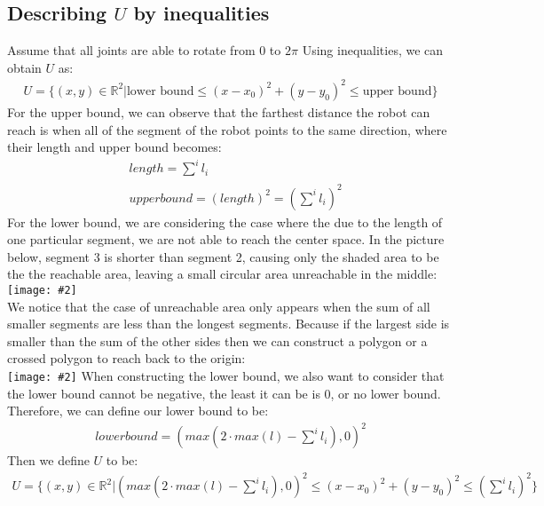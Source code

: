\documentclass[11pt]{article}
\newcommand{\image}[2]{\texttt{[image: \#2]}}
\newcommand{\myalign}[1]{\begin{align*}#1\end{align*}}
\begin{document}
\subsection{Describing $U$ by inequalities}
Assume that all joints are able to rotate from 0 to $2\pi$ Using inequalities, we can obtain $U$ as:
\myalign{
  U = \{(x,y) \in \mathbb{R}^2 | \text{lower bound} \leq (x-x_0)^2 + (y-y_0)^2 \leq \text{upper bound} \}
}
For the upper bound, we can observe that the farthest distance the robot can reach is when all of the segment of the robot points to the same direction, where their length and upper bound becomes:
\myalign{
  & length = \sum_{}^{i}l_i \\
  & upper bound = (length)^2 = (\sum_{}^{i}l_i)^2
}
For the lower bound, we are considering the case where the due to the length of one particular segment, we are not able to reach the center space. In the picture below, segment 3 is shorter than segment 2, causing only the shaded area to be the the reachable area, leaving a small circular area unreachable in the middle: \\
\image{0.25}{img2}
\\
We notice that the case of unreachable area only appears when the sum of all smaller segments are less than the longest segments. Because if the largest side is smaller than the sum of the other sides then we can construct a polygon or a crossed polygon to reach back to the origin: \\
\image{0.25}{img3}
When constructing the lower bound, we also want to consider that the lower bound cannot be negative, the least it can be is 0, or no lower bound. Therefore, we can define our lower bound to be:
\myalign{
    lowerbound = (max(2\cdot max(l) - \sum_{}^{i}l_i), 0)^2
}
Then we define $U$ to be:
\myalign{
    U = \{(x,y) \in \mathbb{R}^2 | (max(2\cdot max(l) - \sum_{}^{i}l_i), 0)^2 \leq (x-x_0)^2 + (y-y_0)^2 \leq (\sum_{}^{i}l_i)^2 \}
}
\end{document}
